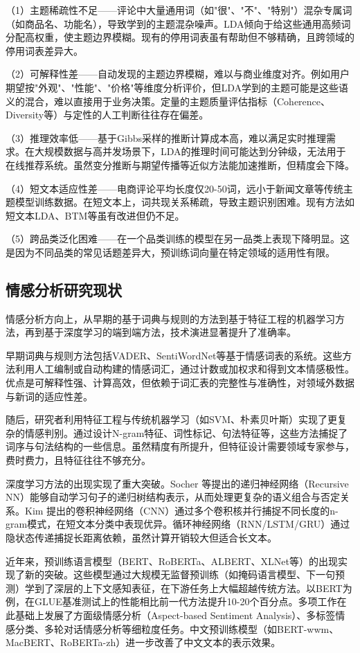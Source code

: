 （1）主题稀疏性不足——评论中大量通用词（如"很"、"不"、"特别"）混杂专属词（如商品名、功能名），导致学到的主题混杂噪声。LDA倾向于给这些通用高频词分配高权重，使主题边界模糊。现有的停用词表虽有帮助但不够精确，且跨领域的停用词表差异大。

（2）可解释性差——自动发现的主题边界模糊，难以与商业维度对齐。例如用户期望按"外观"、"性能"、"价格"等维度分析评价，但LDA学到的主题可能是这些语义的混合，难以直接用于业务决策。定量的主题质量评估指标（Coherence、Diversity等）与定性的人工判断往往存在偏差。

（3）推理效率低——基于Gibbs采样的推断计算成本高，难以满足实时推理需求。在大规模数据与高并发场景下，LDA的推理时间可能达到分钟级，无法用于在线推荐系统。虽然变分推断与期望传播等近似方法能加速推断，但精度会下降。

（4）短文本适应性差——电商评论平均长度仅20-50词，远小于新闻文章等传统主题模型训练数据。在短文本上，词共现关系稀疏，导致主题识别困难。现有方法如短文本LDA、BTM等虽有改进但仍不足。

（5）跨品类泛化困难——在一个品类训练的模型在另一品类上表现下降明显。这是因为不同品类的常见话题差异大，预训练词向量在特定领域的适用性有限。

\subsection{情感分析研究现状}

情感分析方向上，从早期的基于词典与规则的方法到基于特征工程的机器学习方法，再到基于深度学习的端到端方法，技术演进显著提升了准确率。

早期词典与规则方法包括VADER、SentiWordNet等基于情感词表的系统。这些方法利用人工编制或自动构建的情感词汇，通过计数或加权求和得到文本情感极性。优点是可解释性强、计算高效，但依赖于词汇表的完整性与准确性，对领域外数据与新词的适应性差。

随后，研究者利用特征工程与传统机器学习（如SVM、朴素贝叶斯）实现了更复杂的情感判别。通过设计N-gram特征、词性标记、句法特征等，这些方法捕捉了词序与句法结构的一些信息。虽然精度有所提升，但特征设计需要领域专家参与，费时费力，且特征往往不够充分。

深度学习方法的出现实现了重大突破。Socher 等提出的递归神经网络（Recursive NN）能够自动学习句子的递归树结构表示，从而处理更复杂的语义组合与否定关系。Kim 提出的卷积神经网络（CNN）通过多个卷积核并行捕捉不同长度的n-gram模式，在短文本分类中表现优异。循环神经网络（RNN/LSTM/GRU）通过隐状态传递捕捉长距离依赖，虽然计算开销较大但适合长文本。

近年来，预训练语言模型（BERT、RoBERTa、ALBERT、XLNet等）的出现实现了新的突破。这些模型通过大规模无监督预训练（如掩码语言模型、下一句预测）学到了深层的上下文感知表征，在下游任务上大幅超越传统方法。以BERT为例，在GLUE基准测试上的性能相比前一代方法提升10-20个百分点。多项工作在此基础上发展了方面级情感分析（Aspect-based Sentiment Analysis）、多标签情感分类、多轮对话情感分析等细粒度任务。中文预训练模型（如BERT-wwm、MacBERT、RoBERTa-zh）进一步改善了中文文本的表示效果。

